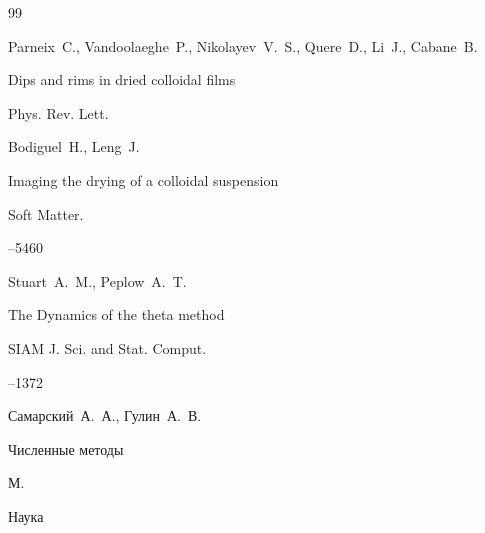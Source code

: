 \begin{thebibliography}{99}






\by Parneix~C., Vandoolaeghe~P., Nikolayev~V.~S., Quere~D., Li~J., Cabane~B.

\paper Dips and rims in dried colloidal films 

\jour Phys. Rev. Lett. 









\by Bodiguel~H., Leng~J.

\paper  Imaging the drying of a colloidal suspension 

\jour Soft Matter. 




--5460





\by Stuart~A.~M., Peplow~A.~T.

\paper  The Dynamics of the theta method 

\jour SIAM J. Sci. and Stat. Comput.




--1372





\by Самарский~А.~А., Гулин~А.~В.

\book  Численные методы

\publaddr М.

\publ Наука







\end{thebibliography}

